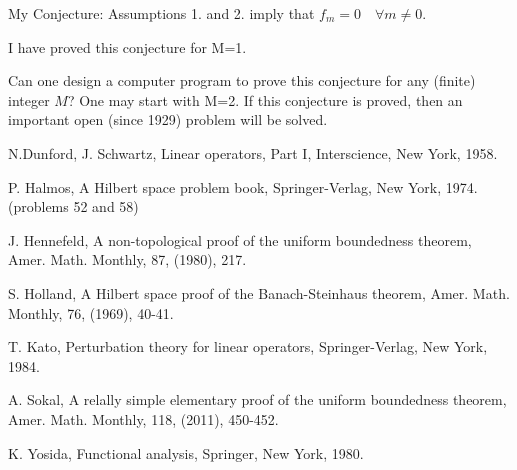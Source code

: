 \documentclass[12pt]{article}
\theoremstyle{plain}
\numberwithin{equation}{section}
\begin{document}
My Conjecture:  Assumptions 1. and 2. imply that $f_m=0 \quad\forall  m\neq 0$.

I have proved this conjecture  for M=1.

Can one design a computer program to prove this conjecture for any (finite) integer $M$?
One may start with M=2.
If this conjecture is proved, then an important open (since 1929) problem will
be solved.


\begin{thebibliography}{999}

 N.Dunford, J. Schwartz,  Linear operators,  Part I, Interscience, New York, 1958.

  P. Halmos, A Hilbert space problem book, Springer-Verlag, New York, 1974. (problems 52 and 58)

 J. Hennefeld, A non-topological proof of the uniform boundedness theorem, Amer. Math. Monthly,
87, (1980), 217.

 S. Holland,  A Hilbert space proof of the Banach-Steinhaus theorem, Amer. Math. Monthly,
76, (1969), 40-41.

 T. Kato,  Perturbation theory for linear operators, Springer-Verlag, New York, 1984.

 A. Sokal,  A relally simple elementary proof of the uniform boundedness theorem,
Amer. Math. Monthly, 118, (2011), 450-452.

 K. Yosida,  Functional analysis, Springer, New York, 1980.

\end{thebibliography}
\end{document}
